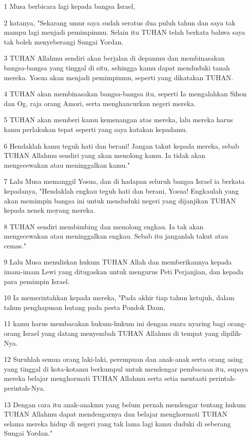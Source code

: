 \par 1 Musa berbicara lagi kepada bangsa Israel,
\par 2 katanya, "Sekarang umur saya sudah seratus dua puluh tahun dan saya tak mampu lagi menjadi pemimpinmu. Selain itu TUHAN telah berkata bahwa saya tak boleh menyeberangi Sungai Yordan.
\par 3 TUHAN Allahmu sendiri akan berjalan di depanmu dan membinasakan bangsa-bangsa yang tinggal di situ, sehingga kamu dapat menduduki tanah mereka. Yosua akan menjadi pemimpinmu, seperti yang dikatakan TUHAN.
\par 4 TUHAN akan membinasakan bangsa-bangsa itu, seperti Ia mengalahkan Sihon dan Og, raja orang Amori, serta menghancurkan negeri mereka.
\par 5 TUHAN akan memberi kamu kemenangan atas mereka, lalu mereka harus kamu perlakukan tepat seperti yang saya katakan kepadamu.
\par 6 Hendaklah kamu teguh hati dan berani! Jangan takut kepada mereka, sebab TUHAN Allahmu sendiri yang akan menolong kamu. Ia tidak akan mengecewakan atau meninggalkan kamu."
\par 7 Lalu Musa memanggil Yosua, dan di hadapan seluruh bangsa Israel ia berkata kepadanya, "Hendaklah engkau teguh hati dan berani, Yosua! Engkaulah yang akan memimpin bangsa ini untuk menduduki negeri yang dijanjikan TUHAN kepada nenek moyang mereka.
\par 8 TUHAN sendiri membimbing dan menolong engkau. Ia tak akan mengecewakan atau meninggalkan engkau. Sebab itu janganlah takut atau cemas."
\par 9 Lalu Musa menuliskan hukum TUHAN Allah dan memberikannya kepada imam-imam Lewi yang ditugaskan untuk mengurus Peti Perjanjian, dan kepada para pemimpin Israel.
\par 10 Ia memerintahkan kepada mereka, "Pada akhir tiap tahun ketujuh, dalam tahun penghapusan hutang pada pesta Pondok Daun,
\par 11 kamu harus membacakan hukum-hukum ini dengan suara nyaring bagi orang-orang Israel yang datang menyembah TUHAN Allahmu di tempat yang dipilih-Nya.
\par 12 Suruhlah semua orang laki-laki, perempuan dan anak-anak serta orang asing yang tinggal di kota-kotamu berkumpul untuk mendengar pembacaan itu, supaya mereka belajar menghormati TUHAN Allahmu serta setia mentaati perintah-perintah-Nya.
\par 13 Dengan cara itu anak-anakmu yang belum pernah mendengar tentang hukum TUHAN Allahmu dapat mendengarnya dan belajar menghormati TUHAN selama mereka hidup di negeri yang tak lama lagi kamu duduki di seberang Sungai Yordan."
